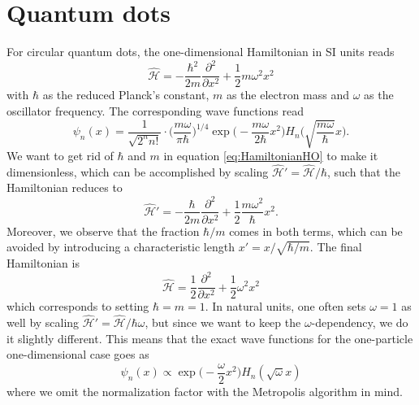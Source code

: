 \section{Quantum dots}
For circular quantum dots, the one-dimensional Hamiltonian in SI units reads
\begin{equation}
\hat{\mathcal{H}}=-\frac{\hbar^2}{2m}\frac{\partial^2}{\partial x^2}+\frac{1}{2}m\omega^2x^2
\label{eq:HamiltonianHO}
\end{equation}
with $\hbar$ as the reduced Planck's constant, $m$ as the electron mass and $\omega$ as the oscillator frequency. The corresponding wave functions read
\begin{equation}
\psi_n(x)=\frac{1}{\sqrt{2^nn!}}\cdot\bigg(\frac{m\omega}{\pi\hbar}\bigg)^{1/4}\exp\Big(-\frac{m\omega}{2\hbar}x^2\Big)H_n\Big(\sqrt{\frac{m\omega}{\hbar}}x\Big).
\end{equation}
We want to get rid of $\hbar$ and $m$ in equation \eqref{eq:HamiltonianHO} to make it dimensionless, which can be accomplished by scaling  $\hat{\mathcal{H}}'= \hat{\mathcal{H}}/\hbar$, such that the Hamiltonian reduces to
\begin{equation}
\hat{\mathcal{H}}'=-\frac{\hbar}{2m}\frac{\partial^2}{\partial x^2}+\frac{1}{2}\frac{m\omega^2}{\hbar}x^2.
\end{equation}
Moreover, we observe that the fraction $\hbar/m$ comes in both terms, which can be avoided by introducing a characteristic length $x'= x/\sqrt{\hbar/m}$. The final Hamiltonian is
\begin{equation}
\hat{\mathcal{H}}=\frac{1}{2}\frac{\partial^2}{\partial x^2}+\frac{1}{2}\omega^2x^2
\end{equation}
which corresponds to setting $\hbar=m=1$. In natural units, one often sets $\omega=1$ as well by scaling $\hat{\mathcal{H}}'=\hat{\mathcal{H}}/\hbar\omega$, but since we want to keep the $\omega$-dependency, we do it slightly different. This means that the exact wave functions for the one-particle one-dimensional case goes as
\begin{equation}
\psi_n(x)\propto\exp\Big(-\frac{\omega}{2}x^2\Big)H_n(\sqrt{\omega}x)
\end{equation}
where we omit the normalization factor with the Metropolis algorithm in mind. 

